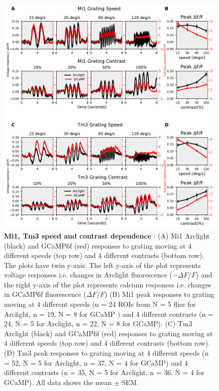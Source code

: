 \documentclass[9pt,lineno]{elife}
\begin{document}
\begin{figure}
\begin{fullwidth}
\includegraphics[width=0.84\linewidth]{figure7}
\caption{\textbf{Mi1, Tm3 speed and contrast dependence} : (A) Mi1 Arclight (black) and GCaMP6f (red) responses to grating moving at 4 different speeds (top row) and 4 different contrasts (bottom row). The plots have twin y-axis. The left y-axis of the plot represents voltage responses i.e. changes in Arclight fluorescence ($-\Delta F/F$) and the right y-axis of the plot represents calcium responses i.e. changes in GCaMP6f fluorescence ($\Delta F/F$) (B) Mi1 peak responses to grating moving at 4 different speeds (n = 24 ROIs from N = 5 flies for Arclight, n = 19, N = 8 for GCaMP ) and 4 different contrasts (n = 24, N = 5 for Arclight, n = 22, N = 8 for GCaMP).  (C) Tm3 Arclight (black) and GCaMP6f (red) responses to grating moving at 4 different speeds (top row) and 4 different contrasts (bottom row). (D) Tm3 peak responses to grating moving at 4 different speeds (n = 52, N = 5 for Arclight, n = 37, N = 4 for GCaMP) and 4 different contrasts (n = 35, N = 5 for Arclight, n = 36, N = 4 for GCaMP). All data shows the mean $\pm$ SEM.}

\label{Mi1Tm3data}
	
\end{fullwidth}
\end{figure} 
\end{document}
